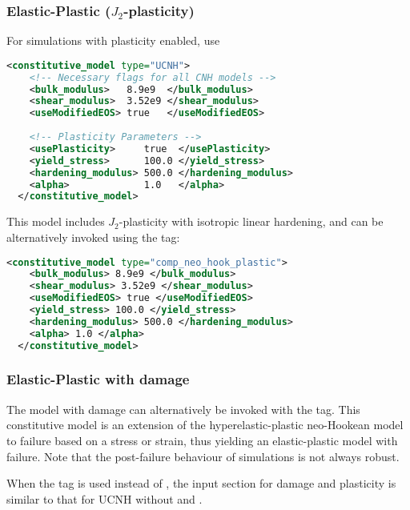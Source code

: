 \subsubsection{Elastic-Plastic ($J_2$-plasticity)}
For simulations with plasticity enabled, use
\begin{lstlisting}[language=XML]
  <constitutive_model type="UCNH"> 
    <!-- Necessary flags for all CNH models -->
    <bulk_modulus>   8.9e9  </bulk_modulus>
    <shear_modulus>  3.52e9 </shear_modulus>
    <useModifiedEOS> true   </useModifiedEOS>
                
    <!-- Plasticity Parameters -->
    <usePlasticity>     true  </usePlasticity>
    <yield_stress>      100.0 </yield_stress>
    <hardening_modulus> 500.0 </hardening_modulus>
    <alpha>             1.0   </alpha>
  </constitutive_model>
\end{lstlisting}
This model includes $J_2$-plasticity with isotropic linear hardening, 
and can be alternatively invoked using the  tag:
\begin{lstlisting}[language=XML]
  <constitutive_model type="comp_neo_hook_plastic">
    <bulk_modulus> 8.9e9 </bulk_modulus>
    <shear_modulus> 3.52e9 </shear_modulus>
    <useModifiedEOS> true </useModifiedEOS>
    <yield_stress> 100.0 </yield_stress>
    <hardening_modulus> 500.0 </hardening_modulus>
    <alpha> 1.0 </alpha>
  </constitutive_model>
\end{lstlisting}

\subsubsection{Elastic-Plastic with damage}
The  model with damage can alternatively be invoked with the 
tag. This constitutive model is an extension of the hyperelastic-plastic neo-Hookean model
to failure based on a stress or strain, thus yielding an elastic-plastic model with failure.  
Note that the post-failure behaviour of simulations is not always robust.  

When the  tag is used instead of , the input section for 
damage and plasticity is similar to that for UCNH without  and 
.

